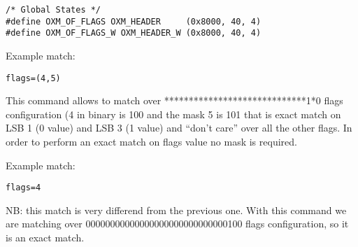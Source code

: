 \begin{verbatim}
/* Global States */
#define OXM_OF_FLAGS OXM_HEADER     (0x8000, 40, 4)
#define OXM_OF_FLAGS_W OXM_HEADER_W (0x8000, 40, 4)
\end{verbatim}

Example match:

\begin{verbatim}
flags=(4,5)
\end{verbatim}

This command allows to match over *****************************1*0 flags configuration (4 in binary is 100 and the mask 5 is 101 that is exact match on LSB 1 (0 value) and LSB 3 (1 value) and ``don’t care'' over all the other flags. In order to perform an exact match on flags value no mask is required.

Example match:
\begin{verbatim}
flags=4
\end{verbatim}
NB: this match is very differend from the previous one. With this command we are matching over 00000000000000000000000000000100 flags configuration, so it is an exact match.

